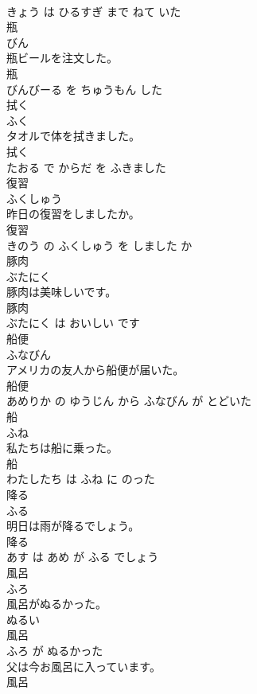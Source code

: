\documentclass[8pt]{extreport}
\begin{document}
\begin{CJK}{UTF8}{min}
\\	きょう は ひるすぎ まで ねて いた			
\\	瓶	
\\	びん			
\\	瓶ビールを注文した。	
\\	瓶 
\\	びんびーる を ちゅうもん した			
\\	拭く	
\\	ふく			
\\	タオルで体を拭きました。	
\\	拭く 
\\	たおる で からだ を ふきました			
\\	復習	
\\	ふくしゅう			
\\	昨日の復習をしましたか。	
\\	復習 
\\	きのう の ふくしゅう を しました か			
\\	豚肉	
\\	ぶたにく			
\\	豚肉は美味しいです。	
\\	豚肉 
\\	ぶたにく は おいしい です			
\\	船便	
\\	ふなびん			
\\	アメリカの友人から船便が届いた。	
\\	船便 
\\	あめりか の ゆうじん から ふなびん が とどいた			
\\	船	
\\	ふね			
\\	私たちは船に乗った。	
\\	船 
\\	わたしたち は ふね に のった			
\\	降る	
\\	ふる			
\\	明日は雨が降るでしょう。	
\\	降る 
\\	あす は あめ が ふる でしょう			
\\	風呂	
\\	ふろ			
\\	風呂がぬるかった。	
\\	ぬるい 
\\	風呂 
\\	ふろ が ぬるかった			
\\	父は今お風呂に入っています。	
\\	風呂 

\end{CJK}
\end{document}
